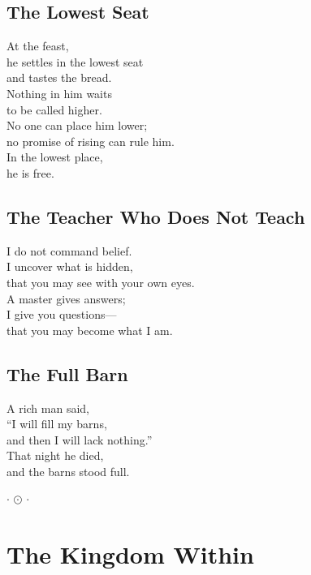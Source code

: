 \documentclass[10pt, openright]{book}
\newcommand{\sectionbreak}{\filbreak}
\newcommand{\sayingsource}[1]{\par\nopagebreak\vspace{0.3\baselineskip}{\raggedleft\footnotesize\itshape #1\par}}
\newcommand{\ornament}{
    \vspace{1.5cm}
    \begin{center}
        \large \(\cdot\) \(\odot\) \(\cdot\)
    \end{center}
    \vspace{1.5cm}
}
\begin{document}
\section{The Lowest Seat}\label{the-lowest-seat}

At the feast,\\
he settles in the lowest seat\\
and tastes the bread.\\
Nothing in him waits\\
to be called higher.\\
No one can place him lower;\\
no promise of rising can rule him.\\
In the lowest place,\\
he is free.

\sayingsource{Tao Te Ching 8 · Luke 14:7--11}

\sectionbreak

\section{The Teacher Who Does Not
Teach}\label{the-teacher-who-does-not-teach}

I do not command belief.\\
I uncover what is hidden,\\
that you may see with your own eyes.\\
A master gives answers;\\
I give you questions---\\
that you may become what I am.

\sayingsource{Thomas 13, 108}

\sectionbreak

\section{The Full Barn}\label{the-full-barn}

A rich man said,\\
``I will fill my barns,\\
and then I will lack nothing.''\\
That night he died,\\
and the barns stood full.

\sayingsource{Thomas 63}

\ornament

\chapter{The Kingdom Within}\label{the-kingdom-within}
\end{document}
